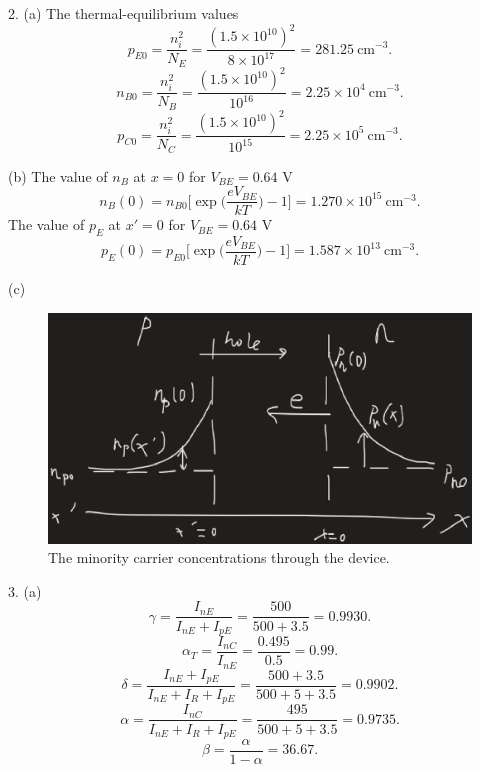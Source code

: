 \documentclass[a4paper]{article}
\begin{document}

2. (a) The thermal-equilibrium values
$$p_{E0}=\frac{n_i^2}{N_E}=\frac{(1.5\times10^{10})^2}{8\times10^{17}}=281.25\ \mathrm{cm^{-3}}.$$
$$n_{B0}=\frac{n_i^2}{N_B}=\frac{(1.5\times10^{10})^2}{10^{16}}=2.25\times10^4\ \mathrm{cm^{-3}}.$$
$$p_{C0}=\frac{n_i^2}{N_C}=\frac{(1.5\times10^{10})^2}{10^{15}}=2.25\times10^5\ \mathrm{cm^{-3}}.$$

(b) The value of $n_B$ at $x=0$ for $V_{BE}=0.64$ V
$$n_B(0)=n_{B0}\bigg[\exp{\bigg(\frac{eV_{BE}}{kT}\bigg)}-1\bigg]=1.270\times10^{15}\ \mathrm{cm^{-3}}.$$
The value of $p_E$ at $x'=0$ for $V_{BE}=0.64$ V
$$p_E(0)=p_{E0}\bigg[\exp{\bigg(\frac{eV_{BE}}{kT}\bigg)}-1\bigg]=1.587\times10^{13}\ \mathrm{cm^{-3}}.$$

(c)
\begin{figure}[H]
    \centering
    \includegraphics[width=1\textwidth]{0.png}
    \caption{The minority carrier concentrations through the device.}
\end{figure}
3. (a)
$$\gamma=\frac{I_{nE}}{I_{nE}+I_{pE}}=\frac{500}{500+3.5}=0.9930.$$
$$\alpha_T=\frac{I_{nC}}{I_{nE}}=\frac{0.495}{0.5}=0.99.$$
$$\delta=\frac{I_{nE}+I_{pE}}{I_{nE}+I_R+I_{pE}}=\frac{500+3.5}{500+5+3.5}=0.9902.$$
$$\alpha=\frac{I_{nC}}{I_{nE}+I_R+I_{pE}}=\frac{495}{500+5+3.5}=0.9735.$$
$$\beta=\frac{\alpha}{1-\alpha}=36.67.$$
\end{document}
